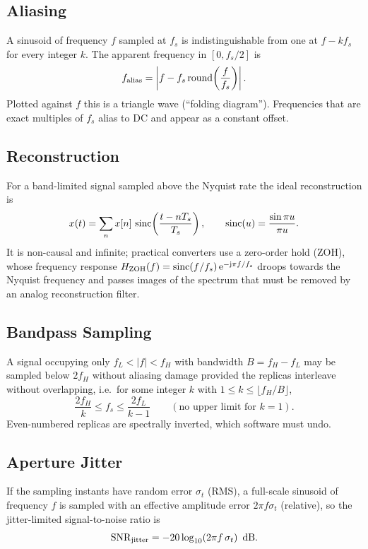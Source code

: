 \documentclass[11pt,a4paper]{article}
\begin{document}
\subsection{Aliasing}
A sinusoid of frequency $f$ sampled at $f_s$ is indistinguishable from one at $f-kf_s$ for every integer $k$. The apparent frequency in $[0,f_s/2]$ is
\begin{equation}
  f_{\rm alias}=\left|f-f_s\,\mathrm{round}\!\left(\frac{f}{f_s}\right)\right| .
  \label{eq:alias}
\end{equation}
Plotted against $f$ this is a triangle wave (``folding diagram''). Frequencies that are exact multiples of $f_s$ alias to DC and appear as a constant offset.

\subsection{Reconstruction}
For a band-limited signal sampled above the Nyquist rate the ideal reconstruction is
\begin{equation}
  x(t)=\sum_{n}x[n]\,\operatorname{sinc}\!\left(\frac{t-nT_s}{T_s}\right),\qquad \operatorname{sinc}(u)=\frac{\sin\pi u}{\pi u}.
  \label{eq:sinc}
\end{equation}
It is non-causal and infinite; practical converters use a zero-order hold (ZOH), whose frequency response $H_{\rm ZOH}(f)=\operatorname{sinc}(f/f_s)\,\mathrm{e}^{-\mathrm{j}\pi f/f_s}$ droops towards the Nyquist frequency and passes images of the spectrum that must be removed by an analog reconstruction filter.

\subsection{Bandpass Sampling}
A signal occupying only $f_L<|f|<f_H$ with bandwidth $B=f_H-f_L$ may be sampled below $2f_H$ without aliasing damage provided the replicas interleave without overlapping, i.e.\ for some integer $k$ with $1\le k\le\lfloor f_H/B\rfloor$,
\begin{equation}
  \frac{2f_H}{k}\le f_s\le\frac{2f_L}{k-1}\qquad(\text{no upper limit for }k=1).
  \label{eq:bandpass}
\end{equation}
Even-numbered replicas are spectrally inverted, which software must undo.

\subsection{Aperture Jitter}
If the sampling instants have random error $\sigma_t$ (RMS), a full-scale sinusoid of frequency $f$ is sampled with an effective amplitude error $2\pi f\sigma_t$ (relative), so the jitter-limited signal-to-noise ratio is
\begin{equation}
  \mathrm{SNR}_{\rm jitter}=-20\log_{10}\!\left(2\pi f\,\sigma_t\right)\ \si{\decibel}.
  \label{eq:jitter}
\end{equation}
\end{document}
